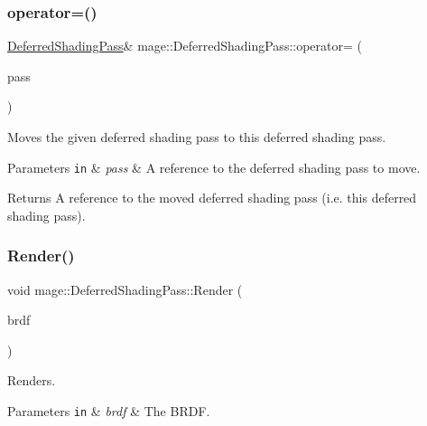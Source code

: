 \subsubsection{\texorpdfstring{operator=()}{operator=()}\hspace{0.1cm}{\footnotesize\ttfamily [2/2]}}
{\footnotesize\ttfamily \hyperlink{classmage_1_1_deferred_shading_pass}{Deferred\+Shading\+Pass}\& mage\+::\+Deferred\+Shading\+Pass\+::operator= (\begin{DoxyParamCaption}\item[{\hyperlink{classmage_1_1_deferred_shading_pass}{Deferred\+Shading\+Pass} \&\&}]{pass }\end{DoxyParamCaption})\hspace{0.3cm}{\ttfamily [delete]}}

Moves the given deferred shading pass to this deferred shading pass.


\begin{DoxyParams}[1]{Parameters}
\mbox{\tt in}  & {\em pass} & A reference to the deferred shading pass to move. \\
\hline
\end{DoxyParams}
\begin{DoxyReturn}{Returns}
A reference to the moved deferred shading pass (i.\+e. this deferred shading pass). 
\end{DoxyReturn}
\hypertarget{classmage_1_1_deferred_shading_pass_ada982919e7c8b643009f8e689d8a3ae8}{}\label{classmage_1_1_deferred_shading_pass_ada982919e7c8b643009f8e689d8a3ae8} 
\subsubsection{\texorpdfstring{Render()}{Render()}}
{\footnotesize\ttfamily void mage\+::\+Deferred\+Shading\+Pass\+::\+Render (\begin{DoxyParamCaption}\item[{\hyperlink{namespacemage_af1044f87544bc38427766a8c795d2f26}{B\+R\+D\+F\+Type}}]{brdf }\end{DoxyParamCaption})}

Renders.


\begin{DoxyParams}[1]{Parameters}
\mbox{\tt in}  & {\em brdf} & The B\+R\+DF. \\
\hline
\end{DoxyParams}
\hypertarget{classmage_1_1_deferred_shading_pass_a1be48c61dfb255a1641bae23d5277e4f}{}\label{classmage_1_1_deferred_shading_pass_a1be48c61dfb255a1641bae23d5277e4f} 
